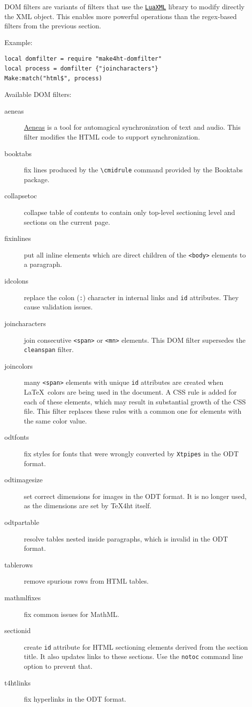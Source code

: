 DOM filters are variants of filters that use the
\href{https://ctan.org/pkg/luaxml}{\texttt{LuaXML}} library to modify
directly the XML object. This enables more powerful operations than the
regex-based filters from the previous section.

Example:

\begin{verbatim}
local domfilter = require "make4ht-domfilter"
local process = domfilter {"joincharacters"}
Make:match("html$", process)
\end{verbatim}

Available DOM filters:

\begin{description}
\item[aeneas]
\href{https://www.readbeyond.it/aeneas/}{Aeneas} is a tool for
automagical synchronization of text and audio. This filter modifies the
HTML code to support synchronization.
\item[booktabs]
fix lines produced by the \texttt{\textbackslash{}cmidrule} command
provided by the Booktabs package.
\item[collapsetoc]
collapse table of contents to contain only top-level sectioning level
and sections on the current page.
\item[fixinlines]
put all inline elements which are direct children of the
\texttt{\textless{}body\textgreater{}} elements to a paragraph.
\item[idcolons]
replace the colon (\texttt{:}) character in internal links and
\texttt{id} attributes. They cause validation issues.
\item[joincharacters]
join consecutive \texttt{\textless{}span\textgreater{}} or
\texttt{\textless{}mn\textgreater{}} elements. This DOM filter
supersedes the \texttt{cleanspan} filter.
\item[joincolors]
many \texttt{\textless{}span\textgreater{}} elements with unique
\texttt{id} attributes are created when \LaTeX~colors are being used in
the document. A CSS rule is added for each of these elements, which may
result in substantial growth of the CSS file. This filter replaces these
rules with a common one for elements with the same color value.
\item[odtfonts]
fix styles for fonts that were wrongly converted by \texttt{Xtpipes} in
the ODT format.
\item[odtimagesize]
set correct dimensions for images in the ODT format. It is no longer
used, as the dimensions are set by TeX4ht itself.
\item[odtpartable]
resolve tables nested inside paragraphs, which is invalid in the ODT
format.
\item[tablerows]
remove spurious rows from HTML tables.
\item[mathmlfixes]
fix common issues for MathML.
\item[sectionid]
create \texttt{id} attribute for HTML sectioning elements derived from
the section title. It also updates links to these sections. Use the
\texttt{notoc} command line option to prevent that.
\item[t4htlinks]
fix hyperlinks in the ODT format.
\end{description}

